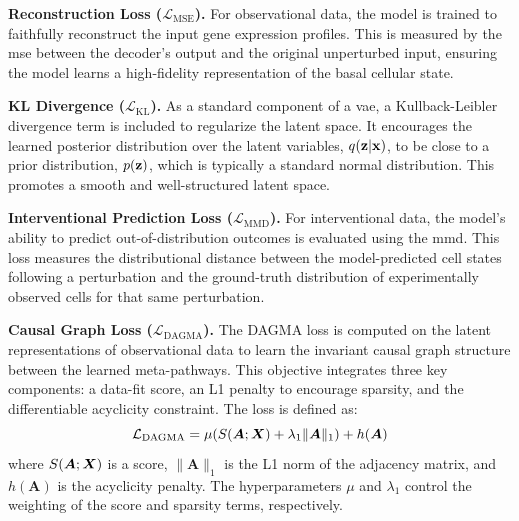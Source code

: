 \documentclass[10pt,letterpaper]{article}
\def\mA{{\bm{A}}}\def\mB{{\bm{B}}}\def\mC{{\bm{C}}}
\theoremstyle{definition}
\theoremstyle{remark}
\newcommand{\variables}{\rvx}
\newcommand{\latentvars}{\rvz}
\newcommand{\datamatrix}{\mX}
\newcommand{\graphmatrix}{\mA}
\newcommand{\mseloss}{\mathcal{L}_{\text{MSE}}}
\newcommand{\kldloss}{\mathcal{L}_{\text{KL}}}
\newcommand{\mmdloss}{\mathcal{L}_{\text{MMD}}}
\newcommand{\dagmaloss}{\mathcal{L}_{\text{DAGMA}}}
\newcommand{\acyclicityfunc}{h}
\newcommand{\scorefunc}{S}
\begin{document}
\textbf{Reconstruction Loss ($\mseloss$).}
For observational data, the model is trained to faithfully reconstruct the input gene expression profiles.
This is measured by the \gls{mse} between the decoder's output and the original unperturbed input, ensuring the model learns a high-fidelity representation of the basal cellular state.

\textbf{KL Divergence ($\kldloss$).}
As a standard component of a \gls{vae}, a Kullback-Leibler divergence term is included to regularize the latent space.
It encourages the learned posterior distribution over the latent variables, $q(\latentvars|\variables)$, to be close to a prior distribution, $p(\latentvars)$, which is typically a standard normal distribution.
This promotes a smooth and well-structured latent space.

\textbf{Interventional Prediction Loss ($\mmdloss$).}
For interventional data, the model's ability to predict out-of-distribution outcomes is evaluated using the \gls{mmd}.
This loss measures the distributional distance between the model-predicted cell states following a perturbation and the ground-truth distribution of experimentally observed cells for that same perturbation.

\textbf{Causal Graph Loss ($\dagmaloss$).}
The DAGMA loss is computed on the latent representations of observational data to learn the invariant causal graph structure between the learned meta-pathways.
This objective integrates three key components: a data-fit score, an L1 penalty to encourage sparsity, and the differentiable acyclicity constraint.
The loss is defined as:
\begin{equation}
    \dagmaloss = \mu(\scorefunc(\graphmatrix; \datamatrix) + \lambda_1 \|\graphmatrix\|_1) + \acyclicityfunc(\graphmatrix)
    \label{eq:dagma_loss_full}
\end{equation}
where $\scorefunc(\graphmatrix; \datamatrix)$ is a score, $\|\graphmatrix\|_1$ is the L1 norm of the adjacency matrix, and $\acyclicityfunc(\graphmatrix)$ is the acyclicity penalty.
The hyperparameters $\mu$ and $\lambda_1$ control the weighting of the score and sparsity terms, respectively.
\end{document}
